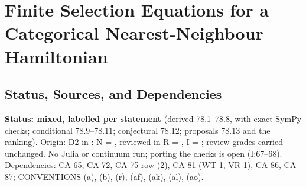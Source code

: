 
\section{Finite Selection Equations for a Categorical Nearest-Neighbour Hamiltonian}
\label{sec:categorical-selection-equations}

\subsection{Status, Sources, and Dependencies}

\textbf{Status: mixed, labelled per statement} (derived 78.1--78.8, with exact SymPy checks;
conditional 78.9--78.11; conjectural 78.12; proposals 78.13 and the ranking).  Origin: D2 in
: \(\mathrm{N}\) = ,
reviewed in \(\mathrm{R}\) = , \(\mathrm{I}\) = ; review grades
carried unchanged.  No Julia or continuum run; porting the checks is open (I:67--68).  Dependencies:
CA-65, CA-72, CA-75 row (2), CA-81 (WT-1, VR-1), CA-86, CA-87; CONVENTIONS (a), (b), (r), (af),
(ak), (al), (ao).

